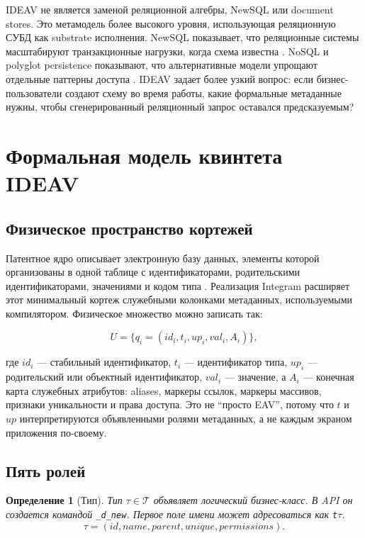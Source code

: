 \documentclass[11pt]{article}
\newtheorem{definition}{Определение}
\begin{document}
IDEAV не является заменой реляционной алгебры, NewSQL или document stores. Это
метамодель более высокого уровня, использующая реляционную СУБД как substrate
исполнения. NewSQL показывает, что реляционные системы масштабируют
транзакционные нагрузки, когда схема известна \citep{pavlo2016newsql}. NoSQL и
polyglot persistence показывают, что альтернативные модели упрощают отдельные
паттерны доступа \citep{sadalage2012nosql,floratou2012nosql}. IDEAV задает
более узкий вопрос: если бизнес-пользователи создают схему во время работы, какие
формальные метаданные нужны, чтобы сгенерированный реляционный запрос оставался
предсказуемым?

\section{Формальная модель квинтета IDEAV}

\subsection{Физическое пространство кортежей}

Патентное ядро описывает электронную базу данных, элементы которой организованы
в одной таблице с идентификаторами, родительскими идентификаторами, значениями и
кодом типа \citep{semenov2018ru,semenov2021us}. Реализация Integram расширяет
этот минимальный кортеж служебными колонками метаданных, используемыми
компилятором. Физическое множество можно записать так:

\[
  U = \{q_i = (id_i, t_i, up_i, val_i, A_i)\},
\]

где \(id_i\) --- стабильный идентификатор, \(t_i\) --- идентификатор типа,
\(up_i\) --- родительский или объектный идентификатор, \(val_i\) --- значение,
а \(A_i\) --- конечная карта служебных атрибутов: aliases, маркеры ссылок,
маркеры массивов, признаки уникальности и права доступа. Это не ``просто EAV'',
потому что \(t\) и \(up\) интерпретируются объявленными ролями метаданных, а не
каждым экраном приложения по-своему.

\subsection{Пять ролей}

\begin{definition}[Тип]
Тип \(\tau \in \mathcal{T}\) объявляет логический бизнес-класс. В API он
создается командой \texttt{\_d\_new}. Первое поле имени может адресоваться как
\texttt{t\(\tau\)}.
\[
  \tau = (id, name, parent, unique, permissions).
\]
\end{definition}
\end{document}
